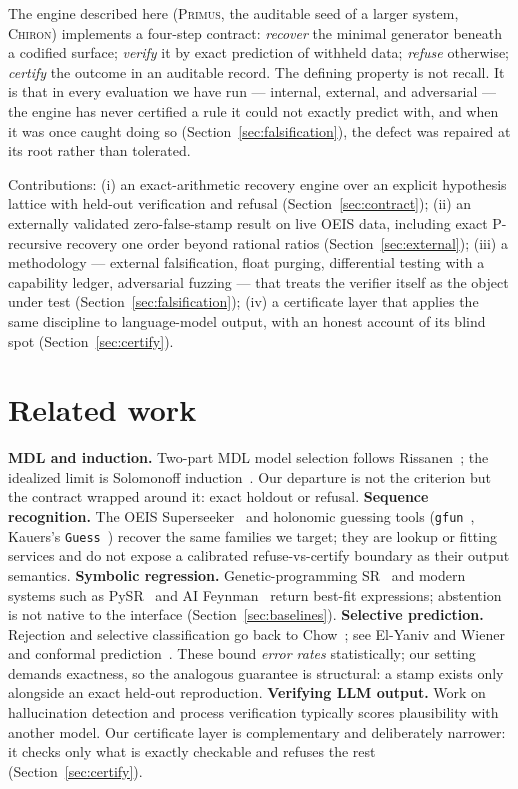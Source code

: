 \documentclass[11pt]{article}
\begin{document}
The engine described here (\textsc{Primus}, the auditable seed of a larger
system, \textsc{Chiron}) implements a four-step contract: \emph{recover} the
minimal generator beneath a codified surface; \emph{verify} it by exact
prediction of withheld data; \emph{refuse} otherwise; \emph{certify} the
outcome in an auditable record. The defining property is not recall. It is
that in every evaluation we have run --- internal, external, and adversarial
--- the engine has never certified a rule it could not exactly predict with,
and when it was once caught doing so (Section~\ref{sec:falsification}), the
defect was repaired at its root rather than tolerated.

Contributions: (i) an exact-arithmetic recovery engine over an explicit
hypothesis lattice with held-out verification and refusal
(Section~\ref{sec:contract}); (ii) an externally validated zero-false-stamp
result on live OEIS data, including exact P-recursive recovery one order
beyond rational ratios (Section~\ref{sec:external}); (iii) a methodology ---
external falsification, float purging, differential testing with a
capability ledger, adversarial fuzzing --- that treats the verifier itself
as the object under test (Section~\ref{sec:falsification}); (iv) a
certificate layer that applies the same discipline to language-model output,
with an honest account of its blind spot (Section~\ref{sec:certify}).

\section{Related work}
\textbf{MDL and induction.} Two-part MDL model selection follows
Rissanen~\cite{rissanen1978}; the idealized limit is Solomonoff
induction~\cite{solomonoff1964}. Our departure is not the criterion but the
contract wrapped around it: exact holdout or refusal.
\textbf{Sequence recognition.} The OEIS Superseeker~\cite{sloane-oeis} and
holonomic guessing tools (\texttt{gfun}~\cite{gfun1994},
Kauers's \texttt{Guess}~\cite{kauers2009}) recover the same families we
target; they are lookup or fitting services and do not expose a calibrated
refuse-vs-certify boundary as their output semantics.
\textbf{Symbolic regression.} Genetic-programming SR~\cite{koza1992,gplearn}
and modern systems such as PySR~\cite{pysr2023} and AI
Feynman~\cite{aifeynman2020} return best-fit expressions; abstention is not
native to the interface (Section~\ref{sec:baselines}).
\textbf{Selective prediction.} Rejection and selective classification go
back to Chow~\cite{chow1970}; see El-Yaniv and Wiener~\cite{elyaniv2010} and
conformal prediction~\cite{vovk2005}. These bound \emph{error rates}
statistically; our setting demands exactness, so the analogous guarantee is
structural: a stamp exists only alongside an exact held-out reproduction.
\textbf{Verifying LLM output.} Work on hallucination detection and process
verification typically scores plausibility with another model. Our
certificate layer is complementary and deliberately narrower: it checks only
what is exactly checkable and refuses the rest (Section~\ref{sec:certify}).
\end{document}
